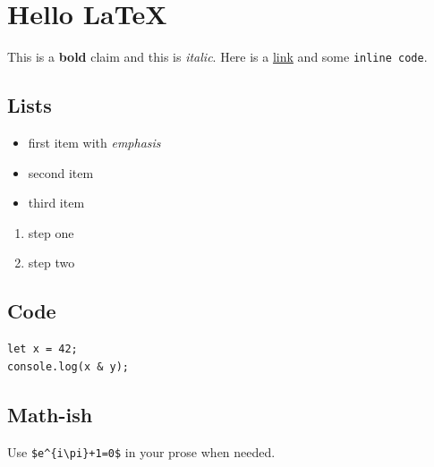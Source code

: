 \documentclass[11pt]{article}
\begin{document}
\section{Hello LaTeX}

This is a \textbf{bold} claim and this is \textit{italic}. Here is a \href{https://example.com}{link} and some \texttt{inline code}.

\subsection{Lists}

\begin{itemize}
  \item first item with \textit{emphasis}
  \item second item
  \item third item
\end{itemize}

\begin{enumerate}
  \item step one
  \item step two
\end{enumerate}

\subsection{Code}

\begin{verbatim}
let x = 42;
console.log(x & y);
\end{verbatim}

\subsection{Math-ish}

Use \texttt{\$e\textasciicircum{}\{i\textbackslash{}pi\}+1=0\$} in your prose when needed.
\end{document}
